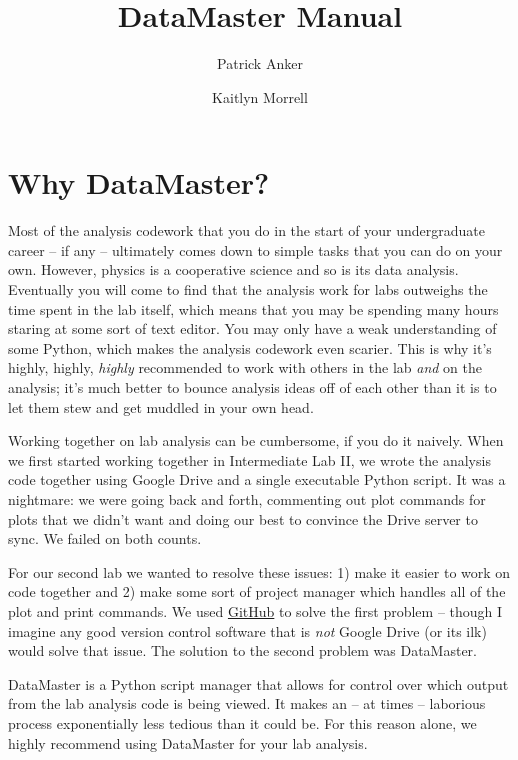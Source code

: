 \documentclass[12pt]{article}
\title{DataMaster Manual}
\author{Patrick Anker \and Kaitlyn Morrell}
\date{}
\newcounter{problem}
\begin{document}
{\selectfont

\maketitle 

\tableofcontents

\section*{Why DataMaster?}

Most of the analysis codework that you do in the start of your undergraduate career -- if any -- ultimately comes down to simple tasks that you can do on your own. However, physics is a cooperative science and so is its data analysis. Eventually you will come to find that the analysis work for labs outweighs the time spent in the lab itself, which means that you may be spending many hours staring at some sort of text editor. You may only have a weak understanding of some Python, which makes the analysis codework even scarier. This is why it's highly, highly, \textit{highly} recommended to work with others in the lab \textit{and} on the analysis; it's much better to bounce analysis ideas off of each other than it is to let them stew and get muddled in your own head.

Working together on lab analysis can be cumbersome, if you do it naively. When we first started working together in Intermediate Lab II, we wrote the analysis code together using Google Drive and a single executable Python script. It was a nightmare: we were going back and forth, commenting out plot commands for plots that we didn't want and doing our best to convince the Drive server to sync. We failed on both counts.

For our second lab we wanted to resolve these issues: 1) make it easier to work on code together and 2) make some sort of project manager which handles all of the plot and print commands. We used \href{https://github.com/}{GitHub} to solve the first problem -- though I imagine any good version control software that is \textit{not} Google Drive (or its ilk) would solve that issue. The solution to the second problem was DataMaster.

DataMaster is a Python script manager that allows for control over which output from the lab analysis code is being viewed. It makes an -- at times -- laborious process exponentially less tedious than it could be. For this reason alone, we highly recommend using DataMaster for your lab analysis.

}
\end{document}
